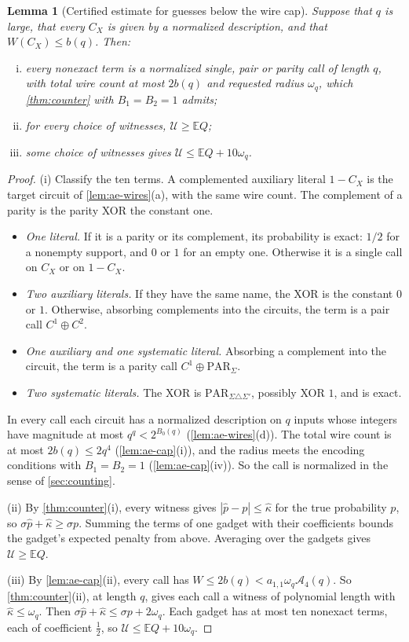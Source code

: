 \documentclass[11pt,letterpaper]{article}
\newtheorem{lemma}[theorem]{Lemma}
\theoremstyle{definition}
\theoremstyle{remark}
\newcommand{\E}{\mathbb E}
\newcommand{\PAR}{\mathrm{PAR}}
\newcommand{\phat}{\widehat p}
\newcommand{\khat}{\widehat\kappa}
\begin{document}
\begin{lemma}[Certified estimate for guesses below the wire cap]\label{lem:ae-estimate}
Suppose that \(q\) is large, that every \(C_X\) is given by a
normalized description, and that \(W(C_X)\le b(q)\). Then:
\begin{enumerate}[(i)]
\item every nonexact term is a normalized single, pair or parity call
of length \(q\), with total wire count at most \(2b(q)\) and requested
radius \(\omega_q\), which \cref{thm:counter} with \(B_1=B_2=1\)
admits;
\item for every choice of witnesses, \(\mathcal U\ge\E Q\);
\item some choice of witnesses gives \(\mathcal U\le\E Q+10\omega_q\).
\end{enumerate}
\end{lemma}
\begin{proof}
(i) Classify the ten terms. A complemented auxiliary literal
\(1-C_X\) is the target circuit of \cref{lem:ae-wires}(a), with the
same wire count. The complement of a parity is the parity XOR the
constant one.
\begin{itemize}
\item \emph{One literal.} If it is a parity or its complement, its
probability is exact: \(1/2\) for a nonempty support, and \(0\) or
\(1\) for an empty one. Otherwise it is a single call on \(C_X\) or on
\(1-C_X\).
\item \emph{Two auxiliary literals.} If they have the same name, the
XOR is the constant \(0\) or \(1\). Otherwise, absorbing complements
into the circuits, the term is a pair call \(C^1\oplus C^2\).
\item \emph{One auxiliary and one systematic literal.} Absorbing a
complement into the circuit, the term is a parity call
\(C^1\oplus\PAR_\Sigma\).
\item \emph{Two systematic literals.} The XOR is
\(\PAR_{\Sigma\triangle\Sigma'}\), possibly XOR \(1\), and is exact.
\end{itemize}
In every call each circuit has a normalized description on \(q\)
inputs whose integers have magnitude at most \(q^q<2^{B_0(q)}\)
(\cref{lem:ae-wires}(d)). The total wire count is at most
\(2b(q)\le2q^4\) (\cref{lem:ae-cap}(i)), and the radius meets the
encoding conditions with \(B_1=B_2=1\) (\cref{lem:ae-cap}(iv)). So the
call is normalized in the sense of \cref{sec:counting}.

(ii) By \cref{thm:counter}(i), every witness gives
\(|\phat-p|\le\khat\) for the true probability \(p\), so
\(\sigma\phat+\khat\ge\sigma p\). Summing the terms of one gadget with
their coefficients bounds the gadget's expected penalty from above.
Averaging over the gadgets gives \(\mathcal U\ge\E Q\).

(iii) By \cref{lem:ae-cap}(ii), every call has
\(W\le2b(q)<a_{1,1}\omega_q\mathcal A_4(q)\). So
\cref{thm:counter}(ii), at length \(q\), gives each call a witness of
polynomial length with \(\khat\le\omega_q\). Then
\(\sigma\phat+\khat\le\sigma p+2\omega_q\). Each gadget has at most
ten nonexact terms, each of coefficient \(\frac12\), so
\(\mathcal U\le\E Q+10\omega_q\).
\end{proof}
\end{document}
